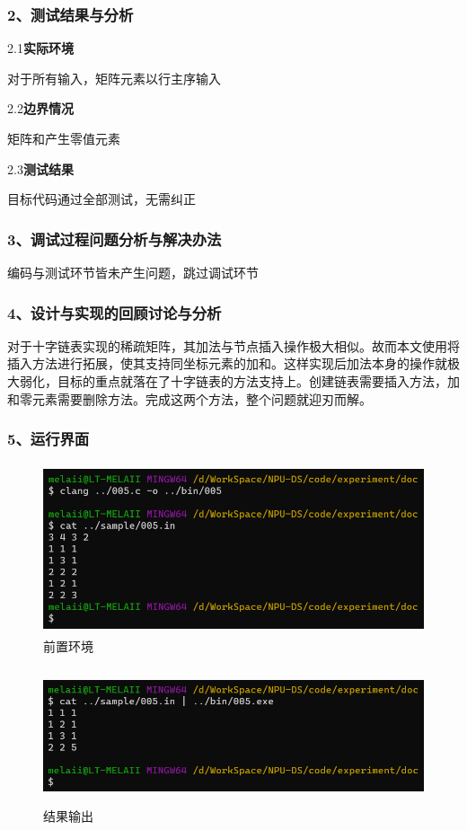 \documentclass[UTF8, a4paper]{ctexart}
\begin{document}
\subsubsection*{2、测试结果与分析}
2.1\;\textbf{实际环境} \par
对于所有输入，矩阵元素以行主序输入\par
2.2\;\textbf{边界情况} \par
矩阵和产生零值元素 \par
2.3\;\textbf{测试结果} \par
目标代码通过全部测试，无需纠正
\subsubsection*{3、调试过程问题分析与解决办法}
编码与测试环节皆未产生问题，跳过调试环节
\subsubsection*{4、设计与实现的回顾讨论与分析}
对于十字链表实现的稀疏矩阵，其加法与节点插入操作极大相似。故而本文使用将插入方法进行拓展，使其支持同坐标元素的加和。这样实现后加法本身的操作就极大弱化，目标的重点就落在了十字链表的方法支持上。创建链表需要插入方法，加和零元素需要删除方法。完成这两个方法，整个问题就迎刃而解。
\subsubsection*{5、运行界面}
\begin{figure}[H]
	\begin{minipage}[t]{\linewidth}
		\centering
		\includegraphics[width=125mm,height=50mm]{./assets/DS05-2}
		\caption{前置环境}
	\end{minipage}
\end{figure}
\begin{figure}[H]
	\begin{minipage}[t]{\linewidth}
		\centering
		\includegraphics[width=125mm,height=40mm]{./assets/DS05-3}
		\caption{结果输出}
	\end{minipage}
\end{figure}
\end{document}
